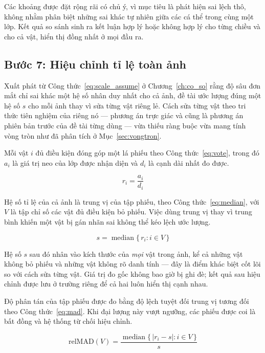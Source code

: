 Các khoảng được đặt rộng rãi có chủ ý, vì mục tiêu là phát hiện sai lệch thô, không nhằm phân biệt những sai khác tự nhiên giữa các cá thể trong cùng một lớp. Kết quả so sánh sinh ra kết luận hợp lý hoặc không hợp lý
cho từng chiều và cho cả vật, hiển thị đồng nhất ở mọi đầu ra.

\subsection{Bước 7: Hiệu chỉnh tỉ lệ toàn ảnh}
\label{sec:calib}

Xuất phát từ Công thức~\eqref{eq:scale_assume} ở Chương~\ref{ch:co_so} rằng độ sâu đơn mắt chỉ
sai khác một hệ số nhân duy nhất cho cả ảnh, đề tài ước lượng đúng một hệ số $s$ cho mỗi ảnh
thay vì sửa từng vật riêng lẻ. Cách sửa từng vật theo tri thức tiên nghiệm của riêng nó ---
phương án trực giác và cũng là phương án phiên bản trước của đề tài từng dùng --- vừa thiếu ràng
buộc vừa mang tính vòng tròn như đã phân tích ở Mục~\ref{sec:vongtron}.

Mỗi vật $i$ đủ điều kiện đóng góp một lá phiếu theo Công thức~\eqref{eq:vote}, trong đó $a_i$ là
giá trị neo của lớp được nhận diện và $d_i$ là cạnh dài nhất đo được.

\begin{equation}
\label{eq:vote}
r_i = \frac{a_i}{d_i}
\end{equation}

Hệ số tỉ lệ của cả ảnh là trung vị của tập phiếu, theo Công thức~\eqref{eq:median}, với $V$ là
tập chỉ số các vật đủ điều kiện bỏ phiếu. Việc dùng trung vị thay vì trung bình khiến một vật bị
gán nhãn sai không thể kéo lệch ước lượng.

\begin{equation}
\label{eq:median}
s = \operatorname{median}\{\, r_i : i \in V \,\}
\end{equation}

Hệ số $s$ sau đó nhân vào kích thước của \emph{mọi} vật trong ảnh, kể cả những vật không bỏ
phiếu và những vật không rõ danh tính --- đây là điểm khác biệt cốt lõi so với cách sửa từng
vật. Giá trị đo gốc không bao giờ bị ghi đè; kết quả sau hiệu chỉnh được lưu ở trường riêng để
cả hai luôn hiển thị cạnh nhau.

Độ phân tán của tập phiếu được đo bằng độ lệch tuyệt đối trung vị tương đối theo
Công thức~\eqref{eq:mad}. Khi đại lượng này vượt ngưỡng, các phiếu được coi là bất đồng và hệ
thống từ chối hiệu chỉnh.

\begin{equation}
\label{eq:mad}
\mathrm{relMAD}(V) = \frac{\operatorname{median}\{\, |r_i - s| : i \in V \,\}}{s}
\end{equation}

